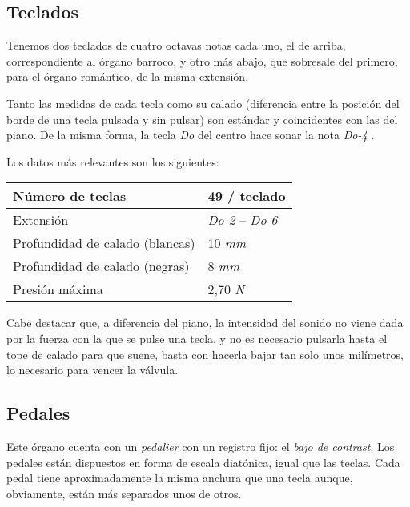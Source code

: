 \subsection{Teclados}

Tenemos dos teclados de cuatro octavas notas cada uno, el de arriba, correspondiente al órgano barroco, y otro más abajo, que sobresale del primero, para el órgano romántico, de la misma extensión. 

Tanto las medidas de cada tecla como su calado (diferencia entre la posición del borde de una tecla pulsada y sin pulsar) son estándar y coincidentes con las del piano. De la misma forma, la tecla \textit{Do} del centro hace sonar la nota \textit{Do-4} \footnotemark.


Los datos más relevantes son los siguientes:

\begin{center}
	\begin{tabular}{|l|l|}
		\hline Número de teclas & 49 / teclado \\
		\hline Extensión & \textit{Do-2} -- \textit{Do-6} \\
		\hline Profundidad de calado (blancas) & 10 \textit{mm} \\
		\hline Profundidad de calado (negras) & 8 \textit{mm} \\
		\hline Presión máxima & 2,70 \textit{N} \\
		\hline
	\end{tabular}
\end{center}

Cabe destacar que, a diferencia del piano, la intensidad del sonido no viene dada por la fuerza con la que se pulse una tecla, y no es necesario pulsarla hasta el tope de calado para que suene, basta con hacerla bajar tan solo unos milímetros, lo necesario para vencer la válvula.

\subsection{Pedales}

Este órgano cuenta con un \textit{pedalier} con un registro fijo: el \textit{bajo de contrast}. Los pedales están dispuestos en forma de escala diatónica, igual que las teclas. Cada pedal tiene aproximadamente la misma anchura que una tecla aunque, obviamente, están más separados unos de otros. 

